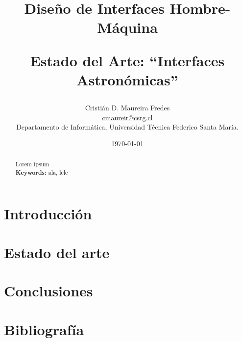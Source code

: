\documentclass[letter, 10pt]{IEEEtran}
\begin{document}

\pagestyle{empty}

\title{Diseño de Interfaces Hombre-Máquina \\ \begin{Large}Estado del Arte: ``Interfaces Astronómicas''\end{Large}}
\author{Cristián D. Maureira Fredes\\\url{cmaureir@csrg.cl}\\Departamento de Informática, Universidad Técnica Federico Santa María.}
\date{\today}

\maketitle
\begin{abstract}
Lorem ipsum\\
{\bf Keywords: } ala, lele
\end{abstract}

\section{Introducción}
\label{sec:introduccion}


\section{Estado del arte}
\label{sec:estado_arte}


\section{Conclusiones}
\label{sec:conclusiones}


\section{Bibliografía}

\end{document}
